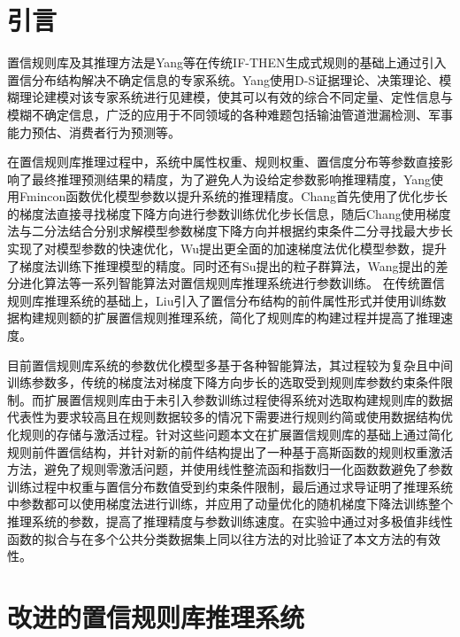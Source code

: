 \documentclass{cjc}
\begin{document}
\maketitle

\section{引言}
置信规则库\cite{a3}及其推理方法是Yang等在传统IF-THEN\cite{a5}生成式规则的基础上通过引入置信分布结构解决不确定信息的专家系统。Yang使用D-S证据理论\cite{a1,a2}、决策理论\cite{b1}、模糊理论\cite{a4}建模对该专家系统进行见建模，使其可以有效的综合不同定量、定性信息与模糊不确定信息，广泛的应用于不同领域的各种难题包括输油管道泄漏检测\cite{a6}、军事能力预估\cite{a7}、消费者行为预测\cite{a8}等。 

在置信规则库推理过程中，系统中属性权重、规则权重、置信度分布等参数直接影响了最终推理预测结果的精度，为了避免人为设给定参数影响推理精度，Yang使用Fmincon\cite{a9}函数优化模型参数以提升系统的推理精度。Chang\cite{a10}首先使用了优化步长的梯度法直接寻找梯度下降方向进行参数训练优化步长信息，随后Chang\cite{a11}使用梯度法与二分法结合分别求解模型参数梯度下降方向并根据约束条件二分寻找最大步长实现了对模型参数的快速优化，Wu\cite{a12}提出更全面的加速梯度法优化模型参数，提升了梯度法训练下推理模型的精度。同时还有Su\cite{a13}提出的粒子群算法，Wang\cite{a14}提出的差分进化算法等一系列智能算法对置信规则库推理系统进行参数训练。 在传统置信规则库推理系统的基础上，Liu\cite{a15}引入了置信分布结构的前件属性形式并使用训练数据构建规则额的扩展置信规则推理系统，简化了规则库的构建过程并提高了推理速度。

目前置信规则库系统的参数优化模型多基于各种智能算法，其过程较为复杂且中间训练参数多，传统的梯度法对梯度下降方向步长的选取受到规则库参数约束条件限制。而扩展置信规则库由于未引入参数训练过程使得系统对选取构建规则库的数据代表性为要求较高且在规则数据较多的情况下需要进行规则约简或使用数据结构优化规则的存储与激活过程。针对这些问题本文在扩展置信规则库的基础上通过简化规则前件置信结构，并针对新的前件结构提出了一种基于高斯函数的规则权重激活方法，避免了规则零激活问题，并使用线性整流函和指数归一化函数数避免了参数训练过程中权重与置信分布数值受到约束条件限制，最后通过求导证明了推理系统中参数都可以使用梯度法进行训练，并应用了动量优化的随机梯度下降法训练整个推理系统的参数，提高了推理精度与参数训练速度。在实验中通过对多极值非线性函数的拟合与在多个公共分类数据集上同以往方法的对比验证了本文方法的有效性。
\section{改进的置信规则库推理系统}
\end{document}
